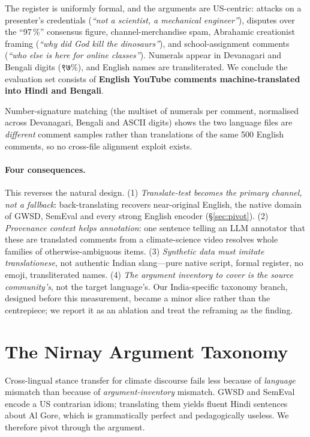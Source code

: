 \documentclass[twocolumn]{ceurart}
\begin{document}
The register is uniformly formal, and the arguments are US-centric: attacks on
a presenter's credentials (\emph{``not a scientist, a mechanical engineer''}),
disputes over the ``97\,\%'' consensus figure, channel-merchandise spam,
Abrahamic creationist framing (\emph{``why did God kill the dinosaurs''}), and
school-assignment comments (\emph{``who else is here for online classes''}).
Numerals appear in Devanagari and Bengali digits (\foreignlanguage{english}{९७\%}),
and English names are transliterated. We conclude the evaluation set consists of
\textbf{English YouTube comments machine-translated into Hindi and Bengali}.

Number-signature matching (the multiset of numerals per comment, normalised
across Devanagari, Bengali and ASCII digits) shows the two language files are
\emph{different} comment samples rather than translations of the same 500
English comments, so no cross-file alignment exploit exists.

\paragraph{Four consequences.}
This reverses the natural design.
(1) \emph{Translate-test becomes the primary channel, not a fallback}:
back-translating recovers near-original English, the native domain of GWSD,
SemEval and every strong English encoder (\S\ref{sec:pivot}).
(2) \emph{Provenance context helps annotation}: one sentence telling an LLM
annotator that these are translated comments from a climate-science video
resolves whole families of otherwise-ambiguous items.
(3) \emph{Synthetic data must imitate translationese}, not authentic Indian
slang---pure native script, formal register, no emoji, transliterated names.
(4) \emph{The argument inventory to cover is the source community's}, not the
target language's. Our India-specific taxonomy branch, designed before this
measurement, became a minor slice rather than the centrepiece; we report it as
an ablation and treat the reframing as the finding.

\section{The Nirnay Argument Taxonomy}
\label{sec:taxonomy}

Cross-lingual stance transfer for climate discourse fails less because of
\emph{language} mismatch than because of \emph{argument-inventory} mismatch.
GWSD and SemEval encode a US contrarian idiom; translating them yields fluent
Hindi sentences about Al Gore, which is grammatically perfect and
pedagogically useless. We therefore pivot through the argument.
\end{document}
